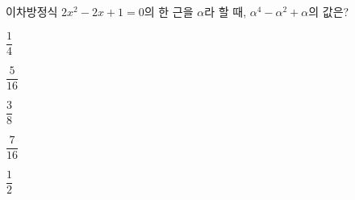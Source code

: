 이차방정식 $2x^2-2x+1=0$의 한 근을 $\alpha$라 할 때, $\alpha^4-\alpha^2+\alpha$의 값은?
\begin{choices32}{\rule[-3ex]{0pt}{8ex}$\dfrac{1}{4}$}{\rule[-3ex]{0pt}{8ex}$\dfrac{5}{16}$}{\rule[-3ex]{0pt}{8ex}$\dfrac{3}{8}$}{\rule[-3ex]{0pt}{8ex}$\dfrac{7}{16}$}{\rule[-3ex]{0pt}{8ex}$\dfrac{1}{2}$}\end{choices32}
